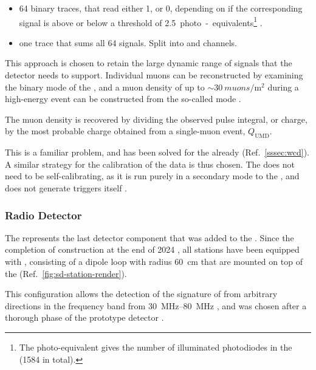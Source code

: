 \begin{itemize}
	\item 64 binary traces, that read either 1, or 0, depending on if the 
	corresponding \SiPM signal is above or below a threshold of 
	\SI{2.5}{photo-equivalents}\footnote{The photo-equivalent gives the 
	number of illuminated photodiodes in the \SiPM (1584 in total).} 
	\cite{bottiStatusPerformanceUnderground2022}.
	\item one \ADC trace that sums all 64 \SiPM signals. Split into \HG and
	\LG channels.
\end{itemize}

This approach is chosen to retain the large dynamic range of signals that the 
detector needs to support. Individual muons can be reconstructed by examining
the binary mode of the \UMD, and a muon density of up to 
$\sim\SI{30}{muons\per\meter\squared}$ during a high-energy \EAS event can be 
constructed from the so-called \ADC mode 
\cite{bottiStatusPerformanceUnderground2022}.

The muon density is recovered by dividing the observed pulse integral, or 
charge, by the most probable charge obtained from a single-muon event, 
$Q_\mathrm{UMD}$. 

This is a familiar problem, and has been solved for the \WCD already (Ref.\ 
\cref{sssec:wcd}). A similar strategy for the calibration of the \UMD data is 
thus chosen. The \UMD does not need to be self-calibrating, as it is run purely
in a secondary mode to the \WCD, and does not generate triggers itself 
\cite{aabCalibrationUndergroundMuon2021}.

\subsubsection{Radio Detector}
\label{sssec:rd}

The \RD represents the last detector component that was added to the \SD. Since
the completion of construction at the end of 2024 
\cite{castellinaSeasonalGreetings202424}, all \SD stations have been equipped
with \SALLAs, consisting of a dipole loop with radius \SI{60}{\centi\meter} 
that are mounted on top of the \SSD (Ref.\ \cref{fig:sd-station-render}). 

This configuration allows the detection of the \EM signature of \EASs from 
arbitrary directions in the frequency band from
\SIrange[range-units = single]{30}{80}{\mega\hertz} 
\cite{pontLargeRadioDetector2021}, and was chosen after a thorough \RND phase 
of the \AERA prototype detector \cite{aabPierreAugerObservatory2020, 
fuchsAugerEngineeringRadio2012, aabEnergyEstimationCosmic2016}.

